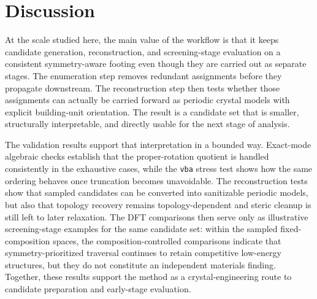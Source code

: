 \documentclass[pdflatex,sn-mathphys-num]{sn-jnl}
\theoremstyle{thmstyleone}%
\begin{document}
\section*{Discussion}
\label{sec:discussion}
At the scale studied here, the main value of the workflow is that it keeps candidate generation, reconstruction, and screening-stage evaluation on a consistent symmetry-aware footing even though they are carried out as separate stages. The enumeration step removes redundant assignments before they propagate downstream. The reconstruction step then tests whether those assignments can actually be carried forward as periodic crystal models with explicit building-unit orientation. The result is a candidate set that is smaller, structurally interpretable, and directly usable for the next stage of analysis.

The validation results support that interpretation in a bounded way. Exact-mode algebraic checks establish that the proper-rotation quotient is handled consistently in the exhaustive cases, while the \texttt{vba} stress test shows how the same ordering behaves once truncation becomes unavoidable. The reconstruction tests show that sampled candidates can be converted into sanitizable periodic models, but also that topology recovery remains topology-dependent and steric cleanup is still left to later relaxation. The DFT comparisons then serve only as illustrative screening-stage examples for the same candidate set: within the sampled fixed-composition spaces, the composition-controlled comparisons indicate that symmetry-prioritized traversal continues to retain competitive low-energy structures, but they do not constitute an independent materials finding. Together, these results support the method as a crystal-engineering route to candidate preparation and early-stage evaluation.
\end{document}
